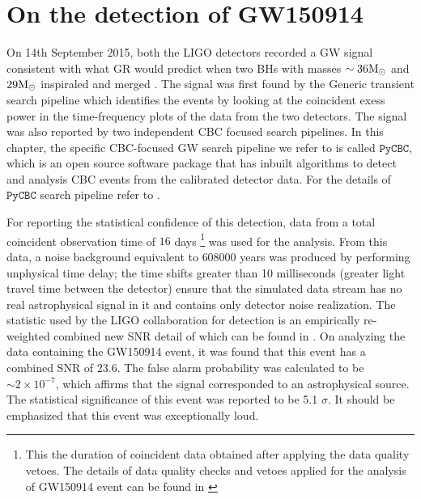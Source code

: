 \section{On the detection of GW150914}

On 14th September 2015, both the LIGO detectors recorded a GW signal consistent with what GR would predict when two BHs with masses $\sim 36\mathrm{M}_\odot$ and $29\mathrm{M}_\odot$ inspiraled and merged \cite{gw150914detection,gw150914search}. The signal was first found by the Generic transient search pipeline \cite{burstpipeline,burstpipeline1}  which identifies the events by looking at the coincident exess power in the time-frequency plots of the data from the two detectors. The signal was also reported by two independent CBC focused search pipelines.  In this chapter, the specific CBC-focused GW search pipeline we refer to is called \textbf{$\texttt{PyCBC}$}, which is an open source software package that has inbuilt algorithms to detect and analysis CBC events from the calibrated detector data. For the details of $\texttt{PyCBC}$ search pipeline refer to \cite{Usman:2015kfa}.

For reporting the statistical confidence of this detection, data from a total coincident observation time of $16$ days \footnote{This the duration of coincident data obtained after applying the data quality vetoes. The details of data quality checks and vetoes applied for the analysis of GW150914 event can be found in \cite{gw150914vetos1,gw150914vetos2}}  was used for the analysis. From this data, a noise background equivalent to 608000 years was produced by performing unphysical time delay; the time shifts greater than 10 milliseconds (greater light travel time between the detector) ensure that the simulated data stream has no real astrophysical signal in it and contains only detector noise realization. The statistic used by the LIGO collaboration for detection is an empirically re-weighted combined new SNR detail of which can be found in \cite{detectionStat1}. On analyzing the data containing the GW150914 event, it was found that this event has a combined SNR of 23.6. The false alarm probability was calculated to be $\sim 2 \times 10^{ -7}$, which affirms that the signal corresponded to an astrophysical source. The statistical significance of this event was reported to be 5.1 $\sigma$. It should be emphasized that this event was exceptionally loud. 






